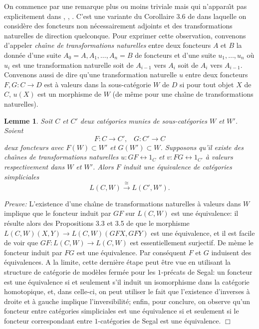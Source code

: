 \documentclass[12pt]{article}
\newcommand{\eop}{\hfill $\Box$\vspace{.1in}}
\newtheorem{lemme}[lemma]{Lemme}
\begin{document}
On commence par une remarque plus ou moins triviale mais qui
n'appara\^{\i}t pas explicitement dans
\cite{DwyerKan1}, \cite{DwyerKan2}, \cite{DwyerKan3}. C'est
une variante du Corollaire 3.6 de \cite{DwyerKan2} dans laquelle on
consid\`ere des foncteurs non n\'ecessairement
adjoints et des transformations naturelles de direction quelconque.
Pour exprimer cette observation, convenons d'appeler {\em cha\^{\i}ne de
transformations naturelles} entre deux foncteurs $A$ et $B$ la donn\'ee
d'une suite $A_0=A, A_1, \dots, A_n=B$ de foncteurs et d'une suite
$u_1, \dots, u_n$ o\`u $u_i$ est une  transformation naturelle
soit de $A_{i-1}$ vers $A_i$ soit de $A_i$ vers $A_{i-1}$. Convenons
aussi
de dire qu'une transformation naturelle $u$ entre deux
foncteurs $F, G: C \rightarrow D$ est \`a
valeurs
dans la sous-cat\'egorie $W$ de $D$ si pour tout objet $X$ de $C$,
$u(X)$ est un morphisme de $W$ (de m\^eme pour une cha\^{\i}ne de
transformations
naturelles).

\begin{lemme}
\label{nonadjoint}
Soit $C$ et $C'$ deux
cat\'egories munies de  sous-cat\'egories $W$ et $W'$. Soient
$$
F: C\rightarrow C' ,\;\;\; G: C' \rightarrow C
$$
deux foncteurs avec $F(W)\subset W'$ et $G(W')\subset W$.
Supposons qu'il existe  des cha\^{\i}nes de transformations naturelles $u:
GF\leftrightarrow
1_{C}$
et $v: FG \leftrightarrow 1_{C'}$
\`a valeurs respectivement dans $W$ et $W'$.
Alors $F$ induit une \'equivalence de cat\'egories
simpliciales $$
L(C,W)\stackrel{\cong}{\rightarrow}L(C',W').
$$
\end{lemme}
{\em Preuve:}  L'existence d'une cha\^{\i}ne de transformations
naturelles \`a valeurs dans $W$
implique que le foncteur induit  par
$GF$ sur $L(C,W)$ est une \'equivalence: il r\'esulte alors des
Propositions 3.3 et
3.5 de \cite{DwyerKan2} que le morphisme $L(C,W)(X,Y)\rightarrow
L(C,W)(GFX,GFY)$ est
une \'equivalence, et il est facile de voir que $GF:L(C,W)\rightarrow
L(C,W)$ est
essentiellement surjectif. De m\`eme le foncteur induit par $FG$ est une
\'equivalence. Par cons\'equent $F$ et $G$ induisent des \'equivalences.
A la limite, cette derni\`ere \'etape peut \^etre vue en utilisant la
structure de cat\'egorie de mod\`eles ferm\'ee pour les $1$-pr\'ecats de Segal:
un foncteur est une \'equivalence si et seulement s'il induit un
isomorphisme dans la cat\'egorie homotopique, et, dans celle-ci, on peut
utiliser le fait que l'existence d'inverses \`a droite et \`a gauche implique
l'inversibilit\'e; enfin, pour conclure, on observe qu'un foncteur entre
cat\'egories
simpliciales est une \'equivalence si et seulement si le foncteur correspondant
entre $1$-cat\'egories de Segal est une \'equivalence.
\eop
\end{document}

